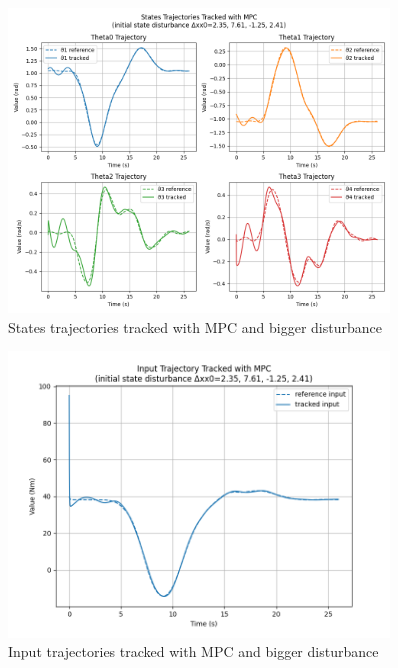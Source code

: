 \documentclass[a4paper,11pt,oneside]{book}
\begin{document}
\begin{figure}[H]
    \centering
    \includegraphics[width=0.9\textwidth]{State_traj_MPC_dist2_T4.png}
    \caption{States trajectories tracked with MPC and bigger disturbance}
    \label{fig:enter-label}
\end{figure}
\begin{figure}[H]
    \centering
    \includegraphics[width=0.9\textwidth]{Input_traj_MPC_dist2_T4.png}
    \caption{Input trajectories tracked with MPC and bigger disturbance}
    \label{fig:enter-label}
\end{figure}
\end{document}
